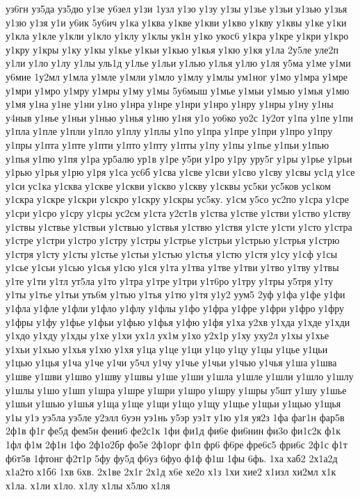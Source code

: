 {уз6гн
уз5да
уз5дю
у1зе
у6зел
у1зи
1узл
у1зо
у1зу
у1зы
у1зье
у1зьи
у1зью
у1зья
у1зю
у1зя
у1и
у6ик
5у6ич
у1ка
у1ква
у1кве
у1кви
у1кво
у1кву
у1квы
у1ке
у1ки
у1кла
у1кле
у1кли
у1кло
у1клу
у1клы
ук1н
у1ко
укос6
у1кра
у1кре
у1кри
у1кро
у1кру
у1кры
у1ку
у1кы
у1кье
у1кьи
у1кью
у1кья
у1кю
у1кя
у1ла
2у5ле
уле2п
у1ли
у1ло
у1лу
у1лы
уль1д
у1лье
у1льи
у1лью
у1лья
у1лю
у1ля
у5ма
у1ме
у1ми
у6мие
1у2мл
у1мла
у1мле
у1мли
у1мло
у1млу
у1млы
ум1ног
у1мо
у1мра
у1мре
у1мри
у1мро
у1мру
у1мры
у1му
у1мы
5у6мыш
у1мье
у1мьи
у1мью
у1мья
у1мю
у1мя
у1на
у1не
у1ни
у1но
у1нра
у1нре
у1нри
у1нро
у1нру
у1нры
у1ну
у1ны
у4ныв
у1нье
у1ньи
у1нью
у1нья
у1ню
у1ня
у1о
уо6ко
уо2с
1у2от
у1па
у1пе
у1пи
у1пла
у1пле
у1пли
у1пло
у1плу
у1плы
у1по
у1пра
у1пре
у1при
у1про
у1пру
у1пры
у1пта
у1пте
у1пти
у1пто
у1пту
у1пты
у1пу
у1пы
у1пье
у1пьи
у1пью
у1пья
у1пю
у1пя
у1ра
ур5алю
ур1в
у1ре
у5ри
у1ро
у1ру
уру5г
у1ры
у1рье
у1рьи
у1рью
у1рья
у1рю
у1ря
у1са
ус6б
у1сва
у1све
у1сви
у1сво
у1сву
у1свы
ус1д
у1се
у1си
ус1ка
у1сква
у1скве
у1скви
у1скво
у1скву
у1сквы
ус5ки
ус5ков
ус1ком
у1скра
у1скре
у1скри
у1скро
у1скру
у1скры
ус5ку.
у1см
у5со
ус2по
у1сра
у1сре
у1сри
у1сро
у1сру
у1сры
ус2см
у1ста
у2ст1в
у1ства
у1стве
у1стви
у1ство
у1ству
у1ствы
у1ствье
у1ствьи
у1ствью
у1ствья
у1ствю
у1ствя
у1сте
у1сти
у1сто
у1стра
у1стре
у1стри
у1стро
у1стру
у1стры
у1стрье
у1стрьи
у1стрью
у1стрья
у1стрю
у1стря
у1сту
у1сты
у1стье
у1стьи
у1стью
у1стья
у1стю
у1стя
у1су
у1сф
у1сы
у1сье
у1сьи
у1сью
у1сья
у1сю
у1ся
у1та
у1тва
у1тве
у1тви
у1тво
у1тву
у1твы
у1те
у1ти
у1тл
ут5ла
у1то
у1тра
у1тре
у1три
у1т6ро
у1тру
у1тры
у5тря
у1ту
у1ты
у1тье
у1тьи
уть6м
у1тью
у1тья
у1тю
у1тя
у1у2
уум5
2уф
у1фа
у1фе
у1фи
у1фла
у1фле
у1фли
у1фло
у1флу
у1флы
у1фо
у1фра
у1фре
у1фри
у1фро
у1фру
у1фры
у1фу
у1фье
у1фьи
у1фью
у1фья
у1фю
у1фя
у1ха
у2хв
у1хда
у1хде
у1хди
у1хдо
у1хду
у1хды
у1хе
у1хи
ух1л
ух1м
у1хо
у2х1р
у1ху
уху2л
у1хы
у1хье
у1хьи
у1хью
у1хья
у1хю
у1хя
у1ца
у1це
у1ци
у1цо
у1цу
у1цы
у1цье
у1цьи
у1цью
у1цья
у1ча
у1че
у1чи
у5чл
у1чу
у1чье
у1чьи
у1чью
у1чья
у1ша
у1шва
у1шве
у1шви
у1шво
у1шву
у1швы
у1ше
у1ши
у1шла
у1шле
у1шли
у1шло
у1шлу
у1шлы
у1шо
у1шп
у1шра
у1шре
у1шри
у1шро
у1шру
у1шры
у5шт
у1шу
у1шье
у1шьи
у1шью
у1шья
у1ща
у1ще
у1щи
у1що
у1щу
у1щье
у1щьи
у1щью
у1щья
у1ы
у1э
уэ5ла
уэ5ле
у2элл
6уэн
уэ1нь
у5эр
уэ1т
у1ю
у1я
уя2з
1фа
фаг1н
фар5в
2ф1в
ф1г
фе5д
фем5н
фени6
фе2с1к
1фи
фи1д
фи6е
фи6нин
фи3о
фи1с2к
ф1к
1фл
ф1м
2ф1н
1фо
2ф1о2бр
фо5е
2ф1орг
ф1п
фр6
ф6ре
фре6с5
фри6с
2ф1с
ф1т
ф6т5в
1фтонг
ф2т1р
5фу
фу5д
ф6уз
6фуо
ф1ф
ф1ш
1фы
6фь.
1ха
хаб2
2х1а2д
х1а2то
х1б6
1хв
6хв.
2х1ве
2х1г
2х1д
х6е
хе2о
х1з
1хи
хие2
х1изл
хи2мл
х1к
х1ла.
х1ли
х1ло.
х1лу
х1лы
х5лю
х1ля
}
